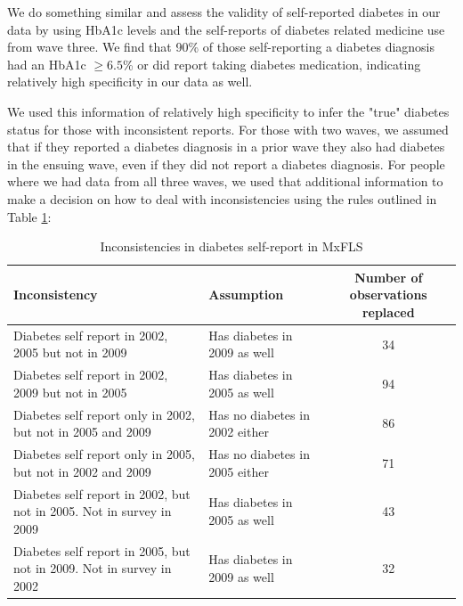 \documentclass[12pt,english]{article}
\providecommand{\tabularnewline}{\\}
\begin{document}
\begin{appendix}
We do something similar and assess the validity of self-reported diabetes in our data by using \ac{HbA1c} levels and the self-reports of diabetes related medicine use from wave three. We find that 90\% of those self-reporting a diabetes diagnosis had an \ac{HbA1c} $\geq6.5$\% or did report taking diabetes medication, indicating relatively high specificity in our data as well.

We used this information of relatively high specificity to infer the "true" diabetes status for those with inconsistent reports. For those with two waves, we assumed that if they reported a diabetes diagnosis in a prior wave they also had diabetes in the ensuing wave, even if they did not report a diabetes diagnosis.
For people where we had data from all three waves, we used that additional information to make a decision on how to deal with inconsistencies using the rules outlined in Table \ref{tab:Inconsistencies}:

\begin{table}[h!]
\caption{\label{tab:Inconsistencies}Inconsistencies in diabetes self-report in MxFLS}
\begin{center}
\begin{adjustbox}{max width=\textwidth}
\begin{tabular}{llc}
\hline 
Inconsistency  & Assumption  & Number of observations replaced\tabularnewline
\hline 
Diabetes self report in 2002, 2005 but not in 2009  & Has diabetes in 2009 as well  & 34\tabularnewline
Diabetes self report in 2002, 2009 but not in 2005  & Has diabetes in 2005 as well  & 94\tabularnewline
Diabetes self report only in 2002, but not in 2005 and 2009  & Has no diabetes in 2002 either  & 86\tabularnewline
Diabetes self report only in 2005, but not in 2002 and 2009  & Has no diabetes in 2005 either  & 71\tabularnewline
Diabetes self report in 2002, but not in 2005. Not in survey in 2009  & Has diabetes in 2005 as well  & 43\tabularnewline
Diabetes self report in 2005, but not in 2009. Not in survey in 2002  & Has diabetes in 2009 as well  & 32\tabularnewline
\end{tabular}
\end{adjustbox}
\end{center}
\end{table}



\end{appendix}
\end{document}
